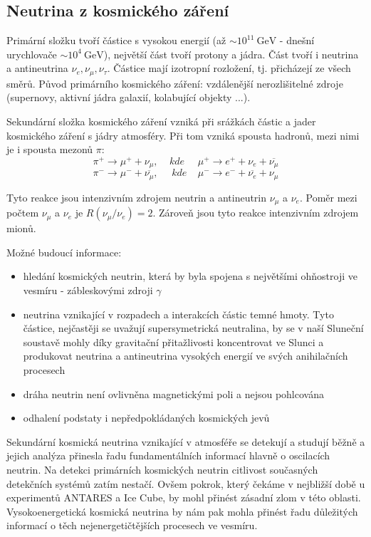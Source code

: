 \documentclass[../../main.tex]{subfiles}
\begin{document}
\subsection{Neutrina z kosmického záření}

Primární složku tvoří částice s vysokou energií (až $\sim 10^{11} ~\mathrm{GeV}$ - dnešní urychlovače $\sim 10^{4} ~\mathrm{GeV}$), největší část tvoří protony a jádra. Část tvoří i neutrina a antineutrina $\nu_e, \nu_{\mu}, \nu_{\tau}$. Částice mají izotropní rozložení, tj. přicházejí ze všech směrů. Původ primárního kosmického záření: vzdálenější nerozlišitelné zdroje (supernovy, aktivní jádra galaxií, kolabující objekty ...).

Sekundární složka kosmického záření vzniká při srážkách částic a jader kosmického záření s jádry atmosféry. Při tom vzniká spousta hadronů, mezi nimi je i spousta mezonů $\pi$:
\begin{equation}
\pi^+ \rightarrow \mu^+ + \nu_{\mu} , ~~~~~ kde ~~~~~~ \mu^+ \rightarrow e^+  + \nu_e + \overline{\nu_{\mu}}
\end{equation}
\begin{equation}
\pi^- \rightarrow \mu^- + \overline{\nu_{\mu}}, ~~~~~~  kde ~~~~~ \mu^- \rightarrow e^- + \overline{\nu_e} + \nu_{\mu}
\end{equation}

Tyto reakce jsou intenzivním zdrojem neutrin a antineutrin $\nu_{\mu}$ a $\nu_e$. Poměr mezi počtem $\nu_{\mu}$ a $\nu_e$ je $R(\nu_{\mu} /\nu_e)= 2$. Zároveň jsou tyto reakce intenzivním zdrojem mionů.

Možné budoucí informace:
\begin{itemize}
	\item hledání kosmických neutrin, která by byla spojena s největšími ohňostroji ve vesmíru - zábleskovými zdroji $\gamma$
	\item neutrina vznikající v rozpadech a interakcích částic temné hmoty. Tyto částice, nejčastěji se uvažují supersymetrická neutralina, by se v naší Sluneční soustavě mohly díky gravitační přitažlivosti koncentrovat ve Slunci a produkovat neutrina a antineutrina vysokých energií ve svých anihilačních procesech
	\item dráha neutrin není ovlivněna magnetickými poli a nejsou pohlcována 
	\item odhalení podstaty i nepředpokládaných kosmických jevů
\end{itemize}
	
Sekundární kosmická neutrina vznikající v atmosféře se detekují a studují běžně a jejich analýza přinesla řadu fundamentálních informací hlavně o oscilacích neutrin. Na detekci primárních kosmických neutrin citlivost současných detekčních systémů zatím nestačí. Ovšem pokrok, který čekáme v nejbližší době u experimentů ANTARES a Ice Cube, by mohl přinést zásadní zlom v této oblasti. Vysokoenergetická kosmická neutrina by nám pak mohla přinést řadu důležitých informací o těch nejenergetičtějších procesech ve vesmíru.
\end{document}
